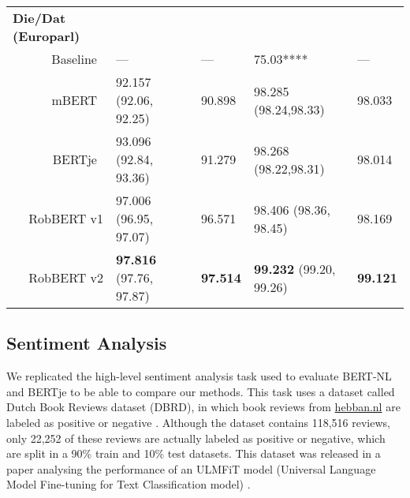 \documentclass[11pt,a4paper]{article}
\begin{document}
\begin{table*}[tbh]
{\begin{tabular}{@{}lll|ll@{}}
\textbf{Die/Dat (Europarl)}                             &                               &                &                                &         \\
\multicolumn{1}{r}{Baseline~\citep{alleinBinary2020}}    & ---                           & ---            & 75.03****                       & ---       \\
\multicolumn{1}{r}{mBERT~\citep{devlinBERT2019a}}        & 92.157 (92.06, 92.25)          & 90.898         & 98.285 (98.24,98.33)           & 98.033                        \\
\multicolumn{1}{r}{BERTje~\citep{devriesBERTje2019}}    & 93.096 (92.84, 93.36)         & 91.279         & 98.268 (98.22,98.31)         & 98.014                         \\
\multicolumn{1}{r}{RobBERT v1}                      & 97.006 (96.95, 97.07)& 96.571 & {98.406} (98.36, 98.45) & {98.169} \\
\multicolumn{1}{r}{RobBERT v2}                      & \textbf{97.816} (97.76, 97.87)& \textbf{97.514}& \textbf{99.232} (99.20, 99.26) & \textbf{99.121} \\ \bottomrule
\end{tabular}} 
\end{table*}

\subsection{Sentiment Analysis}

We replicated the high-level sentiment analysis task used to evaluate BERT-NL~\citep{brandsen2019bert} and BERTje \citep{devriesBERTje2019} to be able to compare our methods.
This task uses a dataset called Dutch Book Reviews dataset (DBRD), in which book reviews from \url{hebban.nl} are labeled as positive or negative \citep{vanderburghMerits2019}.
Although the dataset contains 118,516 reviews, only 22,252 of these reviews are actually labeled as positive or negative, which are split in a 90\% train and 10\% test datasets.
This dataset was released in a paper analysing the performance of an ULMFiT model (Universal Language Model Fine-tuning for Text Classification model) \citep{vanderburghMerits2019}.
\end{document}
